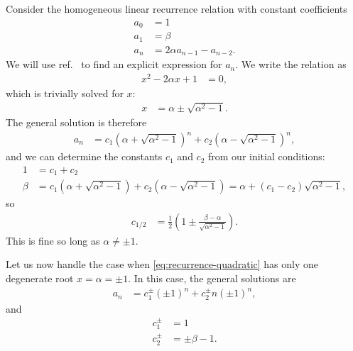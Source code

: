Consider the homogeneous linear recurrence relation with constant coefficients
\begin{subequations}
\begin{align}
	a_0
	&= 1 \\
	a_1
	&= \beta \\
	a_n
	&= 2 \alpha a_{n-1} - a_{n-2}.
\end{align}
\end{subequations}
We will use ref.~\cite[86-91]{slomson1991introduction} to find an explicit expression for $a_n$.
We write the relation as
\begin{align}
	x^2 - 2 \alpha x + 1
	&= 0,
		\label{eq:recurrence-quadratic}
\end{align}
which is trivially solved for $x$:
\begin{align}
	x
	&= \alpha \pm \sqrt{\alpha^2 - 1}.
\end{align}
The general solution is therefore
\begin{align}
	a_n
	&= c_1 \left( \alpha + \sqrt{\alpha^2 - 1} \right)^n + c_2 \left( \alpha - \sqrt{\alpha^2 - 1} \right)^n,
\end{align}
and we can determine the constants $c_1$ and $c_2$ from our initial conditions:
\begin{subequations}
\begin{align}
	1
	&= c_1 + c_2 \\
	\beta
	&= c_1 \left( \alpha + \sqrt{\alpha^2 - 1} \right) + c_2 \left( \alpha - \sqrt{\alpha^2 - 1} \right)
	= \alpha + (c_1 - c_2) \sqrt{\alpha^2 - 1},
\end{align}
\end{subequations}
so
\begin{align}
	c_{1/2}
	&= \frac{1}{2} \left( 1 \pm \frac{\beta - \alpha}{\sqrt{\alpha^2 - 1}} \right).
\end{align}
This is fine so long as $\alpha \ne \pm 1$.

Let us now handle the case when \cref{eq:recurrence-quadratic} has only one degenerate root $x = \alpha = \pm 1$.
In this case, the general solutions are
\begin{align}
	a_n
	&= c_1^\pm (\pm 1)^n + c_2^\pm n (\pm 1)^n,
\end{align}
and
\begin{subequations}
\begin{align}
	c_1^\pm
	&= 1 \\
	c_2^\pm
	&= \pm \beta - 1.
\end{align}
\end{subequations}

